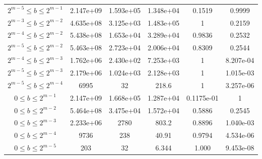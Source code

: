 \documentclass{article}
\begin{document}
\begin{adjustwidth}{-70pt}{-70pt}
{\begin{center}
\begin{tabular}{c|c|c|c|c|c}
$2^{m-5} \leq b \leq 2^{m-1}$ & 2.147e+09 & 1.593e+05 & 1.348e+04 & 0.1519 & 0.9999 \\
$2^{m-3} \leq b \leq 2^{m-2}$ & 4.635e+08 & 3.125e+03 & 1.483e+05 & 1 & 0.2159 \\
$2^{m-4} \leq b \leq 2^{m-2}$ & 5.438e+08 & 1.653e+04 & 3.289e+04 & 0.9836 & 0.2532 \\
$2^{m-5} \leq b \leq 2^{m-2}$ & 5.463e+08 & 2.723e+04 & 2.006e+04 & 0.8309 & 0.2544 \\
$2^{m-4} \leq b \leq 2^{m-3}$ & 1.762e+06 & 2.430e+02 & 7.253e+03 & 1 & 8.207e-04 \\
$2^{m-5} \leq b \leq 2^{m-3}$ & 2.179e+06 & 1.024e+03 & 2.128e+03 & 1 & 1.015e-03 \\
$2^{m-5} \leq b \leq 2^{m-4}$ & 6995 & 32 & 218.6 & 1 & 3.257e-06 \\
$0 \leq b \leq 2^{m-1}$ & 2.147e+09 & 1.668e+05 & 1.287e+04 & 0.1175e-01 & 1 \\
$0 \leq b \leq 2^{m-2}$ & 5.464e+08 & 3.475e+04 & 1.572e+04 & 0.5886 & 0.2545 \\
$0 \leq b \leq 2^{m-3}$ & 2.233e+06 & 2780 & 803.2 & 0.8896 & 1.040e-03 \\
$0 \leq b \leq 2^{m-4}$ & 9736 & 238 & 40.91 & 0.9794 & 4.534e-06 \\
$0 \leq b \leq 2^{m-5}$ & 203 & 32 & 6.344 & 1.000 & 9.453e-08
    \end{tabular}
\end{center}
}
\end{adjustwidth}
\end{document}
